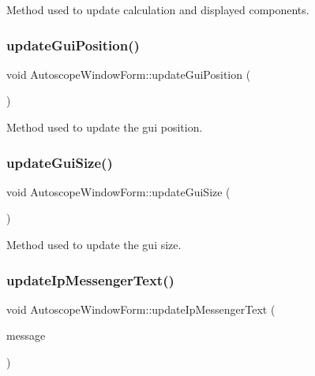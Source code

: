 Method used to update calculation and displayed components. 

\mbox{\label{class_autoscope_window_form_aada2c3ef979ce1718bb981490f6c7495}} 
\subsubsection{\texorpdfstring{updateGuiPosition()}{updateGuiPosition()}}
{\footnotesize\ttfamily void Autoscope\+Window\+Form\+::update\+Gui\+Position (\begin{DoxyParamCaption}\item[{void}]{ }\end{DoxyParamCaption})}



Method used to update the gui position. 

\mbox{\label{class_autoscope_window_form_af62e38bc2170d8504f63f07e5d0b4943}} 
\subsubsection{\texorpdfstring{updateGuiSize()}{updateGuiSize()}}
{\footnotesize\ttfamily void Autoscope\+Window\+Form\+::update\+Gui\+Size (\begin{DoxyParamCaption}\item[{void}]{ }\end{DoxyParamCaption})}



Method used to update the gui size. 

\mbox{\label{class_autoscope_window_form_a38a4a73945cffab764db46b8deec800a}} 
\subsubsection{\texorpdfstring{updateIpMessengerText()}{updateIpMessengerText()}}
{\footnotesize\ttfamily void Autoscope\+Window\+Form\+::update\+Ip\+Messenger\+Text (\begin{DoxyParamCaption}\item[{Q\+String}]{message }\end{DoxyParamCaption})}



